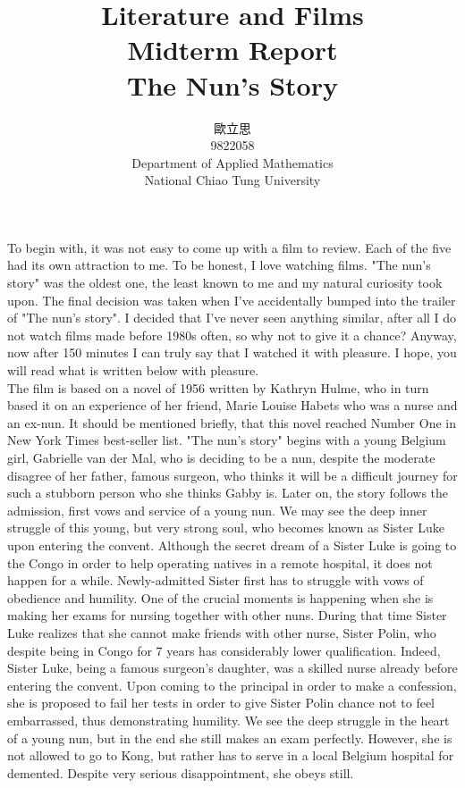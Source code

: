 \documentclass[8pt]{article} %
\title{Literature and Films\\Midterm Report\\The Nun's Story}
\author{歐立思\\9822058\\Department of Applied Mathematics\\National Chiao Tung University}
\begin{document}
\begin{CJK}{UTF8}{bsmi}
\maketitle
\end{CJK}
To begin with, it was not easy to come up with a film to review. Each of the five had its own attraction to me. To be honest, I love watching films. "The nun's story" was the oldest one, the least known to me and my natural curiosity
took upon. The final decision was taken when I've accidentally bumped into the trailer of "The nun's story". I decided that I've never seen anything similar, after all I do not watch films made before 1980s often, so why not to give
it a chance? Anyway, now after 150 minutes I can truly say that I watched it with pleasure. I hope, you will read what is written below with pleasure.\\
The film is based on a novel of 1956 written by Kathryn Hulme, who in turn based it on an experience of her friend, Marie Louise Habets who was a nurse and an ex-nun. It should be mentioned briefly, that this novel reached
Number One in New York Times best-seller list.
"The nun's story" begins with a young Belgium girl, Gabrielle van der Mal, who is deciding to be a nun, despite the moderate disagree of her father, famous surgeon,
who thinks it will be a difficult journey for such a stubborn person who she thinks Gabby is. Later on, the story follows the admission, first vows and service
of a young nun. We may see the deep inner struggle of this young, but very strong soul, who becomes known as Sister Luke upon entering the convent. Although the secret dream of a Sister Luke is going to the Congo in order to help 
operating natives in a remote hospital, it does not happen for a while. Newly-admitted Sister first has to struggle with vows of obedience and humility. One of the crucial moments is happening when she is making her exams
for nursing together with other nuns. During that time Sister Luke realizes that she cannot make friends with other nurse, Sister Polin, who despite being in Congo for 7 years has considerably lower qualification. 
Indeed, Sister Luke, being a famous surgeon's daughter, was a skilled nurse already before entering the convent. Upon coming to the
principal in order to make a confession, she is proposed to fail her tests in order to give Sister Polin chance not to feel embarrassed, thus demonstrating humility. We see the deep struggle in the heart of a young nun, but in the end
she still makes an exam perfectly. However, she is not allowed to go to Kong, but rather has to serve in a local Belgium hospital for demented. Despite very serious disappointment, she obeys still.
\end{document}
